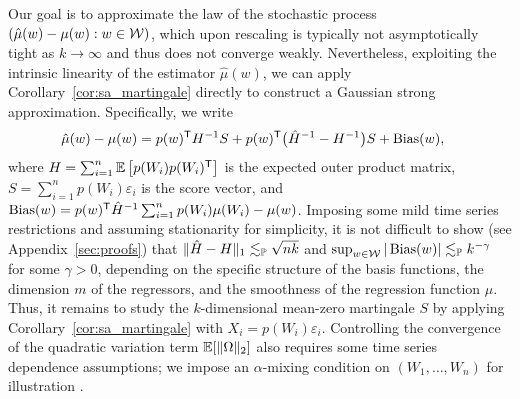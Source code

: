 Our goal is to approximate the law of the stochastic process
$(\hat\mu(w)-\mu(w):w\in\cW)$, which upon rescaling is typically not
asymptotically tight as $k \to \infty$ and thus does not converge weakly.
Nevertheless, exploiting the intrinsic linearity of the estimator $\hat\mu(w)$,
we can apply Corollary~\ref{cor:sa_martingale} directly to construct a Gaussian
strong approximation. Specifically, we write
%
\begin{align*}
  \hat\mu(w) - \mu(w)
  &= p(w)^\T H^{-1} S
  + p(w)^\T \big(\hat H^{-1} - H^{-1}\big) S
  + \Bias(w),
\end{align*}
%
where $H= \sum_{i=1}^n \E\left[p(W_i) p(W_i)^\T\right]$
is the expected outer product matrix, $S = \sum_{i=1}^n p(W_i) \varepsilon_i$
is the score vector, and
$\Bias(w) = p(w)^{\T} \hat H^{-1}\sum_{i=1}^n p(W_i) \mu(W_i) - \mu(w)$.
Imposing some mild time series restrictions and assuming stationarity for
simplicity, it is not difficult to show (see Appendix~\ref{sec:proofs})
that $\|\hat H - H\|_1 \lesssim_\P \sqrt{n k}$ and
$\sup_{w\in\cW} |\Bias(w)| \lesssim_\P k^{-\gamma}$
for some $\gamma>0$, depending on the specific structure of the basis
functions, the dimension $m$ of the regressors, and the smoothness of the
regression function $\mu$. Thus, it remains to study the $k$-dimensional
mean-zero martingale $S$ by applying Corollary~\ref{cor:sa_martingale} with
$X_i=p(W_i) \varepsilon_i$. Controlling the convergence of the quadratic
variation term $\E[\|\Omega\|_2]$ also requires some time series dependence
assumptions; we impose an $\alpha$-mixing condition on $(W_1, \ldots, W_n)$ for
illustration \citep{bradley2005basic}.

